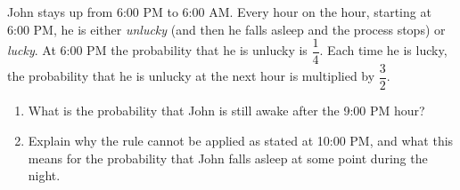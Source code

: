 John stays up from 6:00 PM to 6:00 AM. Every hour on the hour, starting at 6:00 PM, he is either \emph{unlucky} (and then he falls asleep and the process stops) or \emph{lucky}. At 6:00 PM the probability that he is unlucky is $\dfrac{1}{4}$. Each time he is lucky, the probability that he is unlucky at the next hour is multiplied by $\dfrac{3}{2}$.
\begin{enumerate}
\item[(a)] What is the probability that John is still awake after the 9:00 PM hour?
\item[(b)] Explain why the rule cannot be applied as stated at 10:00 PM, and what this means for the probability that John falls asleep at some point during the night.
\end{enumerate}
